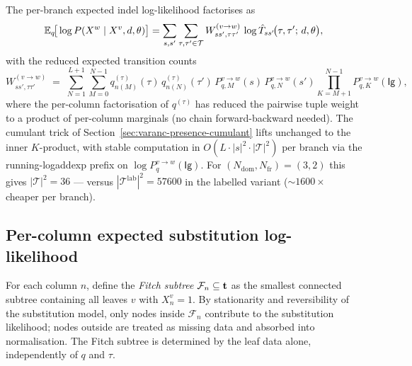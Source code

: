 The per-branch expected indel log-likelihood factorises as
\begin{equation}
\label{eq:E-branch-LL-mixdom-reduced}
\mathbb{E}_q\!\big[\log P(X^w \mid X^v, d, \theta)\big]
= \sum_{s, s'} \sum_{\tau, \tau' \in \mathcal{T}}
   W^{(v\to w)}_{ss', \tau\tau'}\,
   \log \hat{T}_{ss'}\!\big(\tau, \tau';\, d, \theta\big),
\end{equation}
with the reduced expected transition counts
\begin{equation}
\label{eq:W-pair-mixdom-reduced}
W^{(v\to w)}_{ss', \tau\tau'}
\;=\; \sum_{N=1}^{L+1}\!\sum_{M=0}^{N-1}
   q^{(\tau)}_{n(M)}(\tau)\, q^{(\tau)}_{n(N)}(\tau')\,
   P^{v\to w}_{q,M}(s)\, P^{v\to w}_{q,N}(s')
   \prod_{K=M+1}^{N-1} P^{v\to w}_{q,K}(\mathsf{Ig}),
\end{equation}
where the per-column factorisation of $q^{(\tau)}$ has reduced the
pairwise tuple weight to a product of per-column marginals (no chain
forward-backward needed). The cumulant trick of
Section~\ref{sec:varanc-presence-cumulant} lifts unchanged to the
inner $K$-product, with stable computation in
$O(L \cdot |s|^2 \cdot |\mathcal{T}|^2)$ per branch via the
running-logaddexp prefix on $\log P^{v\to w}_q(\mathsf{Ig})$. For
$(N_{\text{dom}}, N_{\text{fr}}) = (3, 2)$ this gives
$|\mathcal{T}|^2 = 36$ — versus $|\mathcal{T}^{\text{lab}}|^2 = 57600$
in the labelled variant ($\sim 1600\times$ cheaper per branch).

\subsection{Per-column expected substitution log-likelihood}
\label{sec:varanc-mixdom-substitution}

For each column $n$, define the \emph{Fitch subtree} $\mathcal{F}_n
\subseteq \mathbf{t}$ as the smallest connected subtree containing
all leaves $v$ with $X^v_n = 1$. By stationarity and reversibility of
the substitution model, only nodes inside $\mathcal{F}_n$ contribute
to the substitution likelihood; nodes outside are treated as missing
data and absorbed into normalisation. The Fitch subtree is determined
by the leaf data alone, independently of $q$ and $\tau$.

